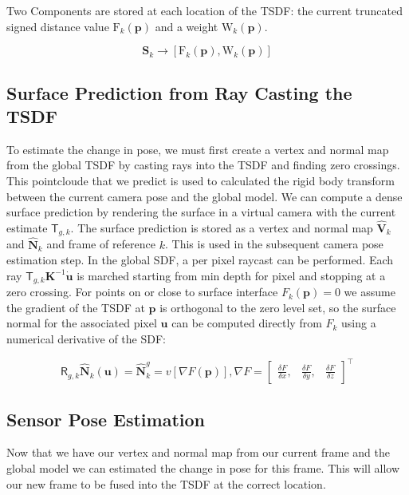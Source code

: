 \documentclass[10pt, twocolumn]{article}
\begin{document}
Two Components are stored at each location of the TSDF: the current truncated signed distance value $\mathrm{F}_{k}(\mathbf{p})$ and a weight $\mathrm{W}_k(\mathbf{p})$.

\begin{equation}
\mathbf{S}_{k} \rightarrow [\mathrm{F}_{k}(\mathbf{p}), \mathrm{W}_{k}(\mathbf{p})]
\end{equation}

\subsection{Surface Prediction from Ray Casting the TSDF}
To estimate the change in pose, we must first create a vertex and normal map from the global TSDF by casting rays into the TSDF and finding zero crossings. This pointcloude that we predict is used to calculated the rigid body transform between the current camera pose and the global model.
We can compute a dense surface prediction by rendering the surface in a virtual camera with the current estimate $\mathsf{T}_{g,k}$. 
The surface prediction is stored as a vertex and normal map $\hat{\mathbf{V}}_{k}$ and $\hat{\mathbf{N}}_{k}$ and frame of reference $k$.
This is used in the subsequent camera pose estimation step.
In the global SDF, a per pixel raycast can be performed. Each ray $\mathsf{T}_{g,k}\mathbf{K}^{-1}\mathbf{\dot{u}}$ is marched starting from min depth for pixel and stopping at a zero crossing.
For points on or close to surface interface $F_{k}(\mathbf{p}) = 0$ we assume the gradient of the TSDF at $\mathbf{p}$ is orthogonal to the zero level set, so the surface normal for the associated pixel $\mathbf{u}$ can be computed directly from $F_{k}$ using a numerical derivative of the SDF:

\begin{equation}
\mathsf{R}_{g,k} \mathbf{\hat{N}}_{k} (\mathbf{u}) = \mathbf{\hat{N}}^{g}_{k} = v[\nabla F(\mathbf{p})], \nabla F = 
\begin{bmatrix}
    \frac{\delta F}{\delta x}, & \frac{\delta F}{\delta y}, & \frac{\delta F}{\delta z}
\end{bmatrix}^{\top}
\end{equation}


\subsection{Sensor Pose Estimation}
Now that we have our vertex and normal map from our current frame and the global model we can estimated the change in pose for this frame. This will allow our new frame to be fused into the TSDF at the correct location.
\end{document}
